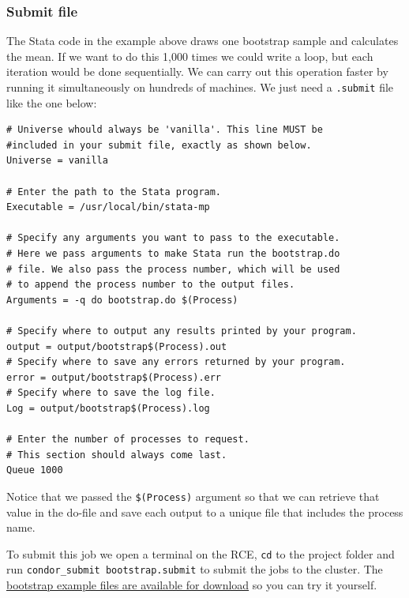 \documentclass[11pt]{article}
\begin{document}
\subsubsection{Submit file}
\label{sec:org9dd35b6}
The Stata code in the example above draws one bootstrap sample and calculates the mean. If we want to do this 1,000 times we could write a loop, but each iteration would be done sequentially. We can carry out this operation faster by running it simultaneously on hundreds of machines. We just need a \texttt{.submit} file like the one below:
\begin{verbatim}
# Universe whould always be 'vanilla'. This line MUST be 
#included in your submit file, exactly as shown below.
Universe = vanilla

# Enter the path to the Stata program.
Executable = /usr/local/bin/stata-mp

# Specify any arguments you want to pass to the executable.
# Here we pass arguments to make Stata run the bootstrap.do
# file. We also pass the process number, which will be used
# to append the process number to the output files.
Arguments = -q do bootstrap.do $(Process)

# Specify where to output any results printed by your program.
output = output/bootstrap$(Process).out
# Specify where to save any errors returned by your program.
error = output/bootstrap$(Process).err
# Specify where to save the log file.
Log = output/bootstrap$(Process).log

# Enter the number of processes to request.
# This section should always come last.
Queue 1000

\end{verbatim}
Notice that we passed the \texttt{\$(Process)} argument so that we can retrieve that value in the do-file and save each output to a unique file that includes the process name.

To submit this job we open a terminal on the RCE, \texttt{cd} to the project folder and run \texttt{condor\_submit bootstrap.submit} to submit the jobs to the cluster. The \href{Stata\_examples/bootstrap.zip}{bootstrap example files are available for download} so you can try it yourself.
\end{document}
